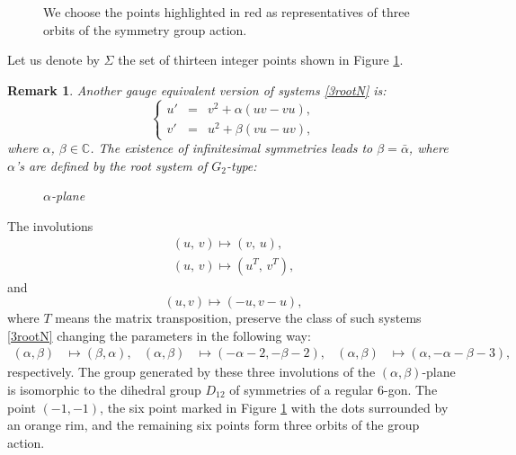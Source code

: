 \documentclass{article}
\theoremstyle{plain}
\newtheorem{remark}{Remark}
\begin{document}
{\color{black}
\begin{figure}[H]
    \centering
    \scalebox{1.1}{}
    \caption{We choose the points highlighted in red as representatives of  three orbits of the symmetry group action.}
    \label{pic:albetplane}
\end{figure}
}
Let us denote by $\Sigma$ the set of thirteen integer points shown in Figure \ref{pic:albetplane}.

\begin{remark} Another gauge equivalent version of systems \eqref{3rootN} is:
\begin{equation}\label{3rootN1}
    \left\{
    \begin{array}{lcl}
    u' &=&  v^2 + \alpha (u v - v u),
    \\ [2mm]
    v' &=& u^2  + \beta (v u - u v),
    \end{array}   
    \right.
\end{equation}
where $\alpha$, $\beta \in {\mathbb C}$. The existence of infinitesimal symmetries leads to $\beta=\bar \alpha$, where $\alpha$'s are defined by the root system of $G_2$-type:
\begin{figure}[H]
    \centering
    \scalebox{1.1}{}
    \caption{$\alpha$-plane}
    \label{pic:G2}
\end{figure}
\end{remark}

The involutions
\begin{gather}
    \label{trr1}
    (u,\,v) \mapsto (v,\,u),
    \\[2mm]
    \label{trr2}
    (u,\,v) \mapsto (u^T,\,v^T),  
\end{gather}
and
\begin{equation}
    (u,v) \mapsto (-u,v-u),
\end{equation}
where $T$ means the matrix transposition, preserve the class of such systems \eqref{3rootN} changing the parameters in the following way: 
\begin{align} 
    (\alpha,\beta) 
    &\mapsto (\beta, \alpha), 
    &
    (\alpha,\beta) 
    &\mapsto (- \alpha - 2,   - \beta - 2), 
    &
    (\alpha,\beta) 
    &\mapsto (\alpha,   - \alpha - \beta - 3),
\end{align}
respectively.
The group generated by these three involutions of the $(\alpha, \beta)$-plane is isomorphic to the dihedral group $D_{12}$ of symmetries of a regular 6-gon. The point $(-1,-1)$, the six point marked in Figure \ref{pic:albetplane} with the dots surrounded by an orange rim, and the remaining six points form three orbits of the group action.
\end{document}

